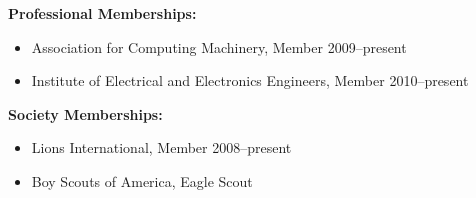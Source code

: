 \textbf{Professional Memberships:}

\begin{itemize}
	\item{Association for Computing Machinery, Member \hfill 2009--present}
	\item{Institute of Electrical and Electronics Engineers, Member \hfill 2010--present}
\end{itemize}


\textbf{Society Memberships:}

\begin{itemize}
	\item{Lions International, Member \hfill 2008--present}
	\item{Boy Scouts of America, Eagle Scout}
\end{itemize}
